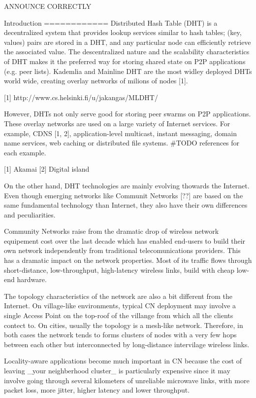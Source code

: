 ANNOUNCE CORRECTLY

Introduction
============
Distributed Hash Table (DHT) is a decentralized system that provides lookup services 
similar to hash tables; (key, values) pairs are stored in a DHT, and any particular 
node can efficiently retrieve the associated value. The descentralized nature and 
the scalability characteristics of DHT makes it the preferred way for storing shared 
state on P2P applications (e.g. peer lists). Kademlia and Mainline DHT are the most 
widley deployed DHTs world wide, creating overlay networks of milions of nodes [1].

[1] http://www.cs.helsinki.fi/u/jakangas/MLDHT/

However, DHTs not only serve good for storing peer swarms on P2P applications. These overlay 
networks are used on a large variety of Internet services. For example, CDNS [1, 2], 
application-level multicast, instant messaging, domain name services, web caching 
or distributed file systems. #TODO references for each example.

[1] Akamai
[2] Digital island

On the other hand, DHT technologies are mainly evolving thowards the Internet. 
Even though emerging networks like Communit Networks [??] are based on the same 
fundamental technology than Internet, they also have their own differences and peculiarities.

Community Networks raise from the dramatic drop of wireless network equipement 
cost over the last decade which has enabled end-users to build their own network 
independently from traditional telecomunications providers. This has a dramatic 
impact on the network properties. Most of its traffic flows through short-distance, 
low-throughput, high-latency wireless links, build with cheap low-end hardware.

The topology characteristics of the network are also a bit different from the Internet. 
On village-like environments, typical CN deployment may involve a single Access Point 
on the top-roof of the villange from which all the clients contect to. On cities, 
usually the topology is a mesh-like network. Therefore, in both cases the network 
tends to forms clusters of nodes with a very few hops between each other but interconnected 
by long-distance intervilage wireless links.

Locality-aware applications become much important in CN because the cost of leaving 
_your neighberhood cluster_ is particularly expensive since it may involve going 
through several kilometers of unreliable microwave links, with more packet loss, 
more jitter, higher latency and lower throughput.

